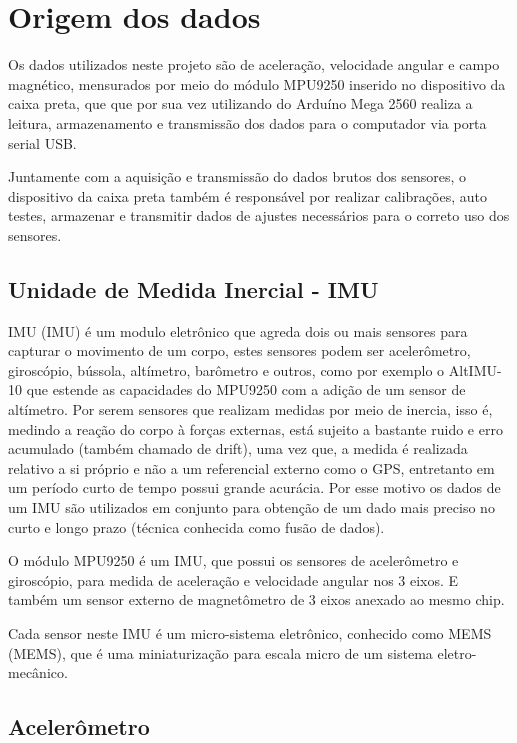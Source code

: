 \section{Origem dos dados}
Os dados utilizados neste projeto são de aceleração, velocidade angular e campo magnético, mensurados por meio do módulo MPU9250 inserido no dispositivo da caixa preta, que que por sua vez utilizando do Arduíno Mega 2560 realiza a leitura, armazenamento e transmissão dos dados para o computador via porta serial USB.

Juntamente com a aquisição e transmissão do dados brutos dos sensores, o dispositivo da caixa preta também é responsável por realizar calibrações, auto testes, armazenar e transmitir dados de ajustes necessários para o correto uso dos sensores.

    \subsection{Unidade de Medida Inercial - IMU}
    \acrshort{IMU} (\acrlong{IMU}) é um modulo eletrônico que agreda dois ou mais sensores para capturar o movimento de um corpo, estes sensores podem ser acelerômetro, giroscópio, bússola, altímetro, barômetro e outros, como por exemplo o AltIMU-10 que estende as capacidades do MPU9250 com a adição de um sensor de altímetro. Por serem sensores que realizam medidas por meio de inercia, isso é, medindo a reação do corpo à forças externas, está sujeito a bastante ruido e erro acumulado (também chamado de drift), uma vez que, a medida é realizada relativo a si próprio e não a um referencial externo como o GPS, entretanto em um período curto de tempo possui grande acurácia. Por esse motivo os dados de um \acrshort{IMU} são utilizados em conjunto para obtenção de um dado mais preciso no curto e longo prazo (técnica conhecida como  fusão de dados).
    
    O módulo MPU9250 é um \acrshort{IMU}, que possui os sensores de acelerômetro e giroscópio, para medida de aceleração e velocidade angular nos 3 eixos. E também um sensor externo de magnetômetro de 3 eixos anexado ao mesmo chip.
    
    Cada sensor neste \acrshort{IMU} é um micro-sistema eletrônico, conhecido como \acrshort{MEMS} (\acrlong{MEMS}), que é uma miniaturização para escala micro de um sistema eletro-mecânico.
    
    \subsection{Acelerômetro}
    
